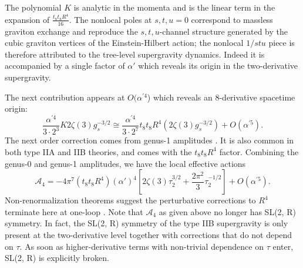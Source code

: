 The polynomial $K$ is analytic in the momenta and is the linear term in the expansion of $\frac{t_8 t_8 R^4}{16}$.
The nonlocal poles at $s, t, u = 0$ correspond to massless graviton exchange and reproduce the $s,t,u$-channel structure generated by the cubic graviton vertices of the Einstein-Hilbert action; the nonlocal $1/stu$ piece is therefore attributed to the tree-level supergravity dynamics.
Indeed it is accompanied by a single factor of $\alpha'$ which reveals its origin in the two-derivative supergravity.

The next contribution appears at $O(\alpha^{\prime 4}$) which reveals an 8-derivative spacetime origin:
\begin{equation}
\frac{\alpha^{\prime 4}}{3 \cdot 2^3} K 2 \zeta(3) g_s^{-3/2} \cong
\frac{\alpha^{\prime 4}}{3 \cdot 2^7} t_8t_8 R^4 (2 \zeta(3) g_s^{-3/2}) + O(\alpha^{\prime 5}).
\end{equation}
The next order correction comes from genus-1 amplitudes \cite{Green:1999pv}.
It is also common in both type IIA and IIB theories, and comes with the $t_8 t_8 R^4$ factor. 
Combining the genus-0 and genus-1 amplitudes, we have the local effective actions
\begin{equation}
\mathcal{A}_4 = -4\pi^7 (t_8 t_8 R^4)(\alpha')^4
\left[
2 \zeta(3)\tau_2^{3/2}
+\frac{2\pi^2}{3}\tau_2^{-1/2}
\right]
+O(\alpha^{\prime 5}).
\end{equation}
Non-renormalization theorems suggest the perturbative corrections to $R^4$ terminate here at one-loop \cite{Green:1997tv,Kehagias:1997cq}.
Note that $\mathcal{A}_4$ as given above no longer has SL(2, R) symmetry. 
In fact, the SL(2, R) symmetry of the type IIB supergravity is only present at the two-derivative level together with corrections that do not depend on $\tau$.
As soon as higher-derivative terms with non-trivial dependence on $\tau$ enter, SL(2, R) is explicitly broken.

